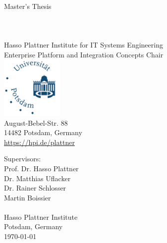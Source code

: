 \begin{titlepage}

\thispagestyle{empty}
\begin{center}
	\LARGE
	Master's Thesis\\
	\vspace{0.4cm}
	\Huge
    \TITLE{}\\
	\vspace{0.4cm}
	\vspace{0.5cm}
	\LARGE
	\textbf{\AUTHOR}\\
	\normalsize
  \Mail{\EMAIL}\\
	\vspace{0.4cm}
	\small
	Hasso Plattner Institute for IT Systems Engineering\\
	Enterprise Platform and Integration Concepts Chair\\
	\vspace{0.3cm}
	\hspace{1cm}
	\includegraphics[width=3cm]{figures/Universitaet_Potsdam_logo}\\
	\vspace{0.1cm}
	August-Bebel-Str. 88\\
	14482 Potsdam, Germany\\
	\url{https://hpi.de/plattner}\\
\end{center}
\vspace{0.7cm}
Supervisors:
\vspace{0.3cm}\\
Prof. Dr. Hasso Plattner\\
Dr. Matthias Uflacker\\
Dr. Rainer Schlosser\\
Martin Boissier\\
\vspace{0.3cm}\\
Hasso Plattner Institute\\
Potsdam, Germany
\vspace{0.4cm}\\
\today
\end{titlepage}
